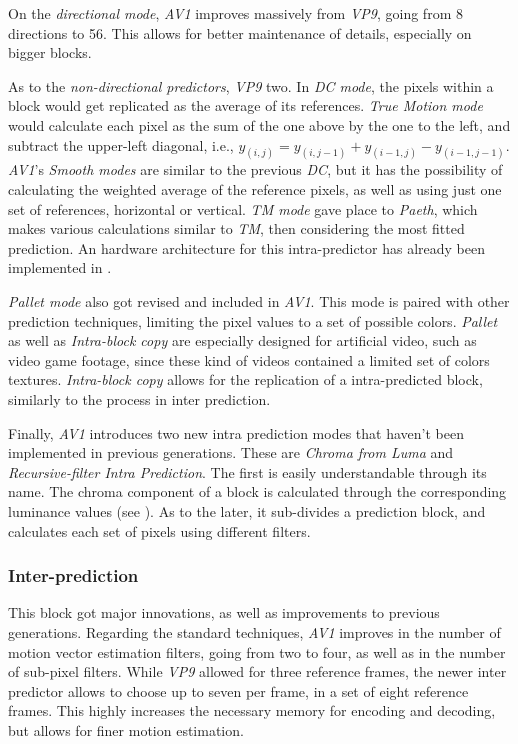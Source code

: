 On the \emph{directional mode}, \emph{AV1} improves massively from \emph{VP9}, going from 8 directions to 56. This allows for better maintenance of details, especially on bigger blocks. 

As to the \emph{non-directional predictors}, \emph{VP9} two. In \emph{DC mode}, the pixels  within a block would get replicated as the average of its references. \emph{True Motion mode} would calculate each pixel as the sum of the one above by the one to the left, and subtract the upper-left diagonal, i.e., $y_{(i,j)}=y_{(i,j-1)}+y_{(i-1,j)}-y_{(i-1,j-1)}$. \emph{AV1}'s \emph{Smooth modes} are similar to the previous \emph{DC}, but it has the possibility of calculating the weighted average of the reference pixels, as well as using just one set of references, horizontal or vertical. \emph{TM mode} gave place to \emph{Paeth}, which makes various calculations similar to \emph{TM}, then considering the most fitted prediction. An hardware architecture for this intra-predictor has already been implemented in \cite{correaHighThroughputHardware2019}.

\emph{Pallet mode} also got revised and included in \emph{AV1}. This mode is paired with other prediction techniques, limiting the pixel values to a set of possible colors. \emph{Pallet} as well as \emph{Intra-block copy} are especially designed for artificial video, such as video game footage, since these kind of videos contained a limited set of colors textures. \emph{Intra-block copy} allows for the replication of a intra-predicted block, similarly to the process in inter prediction.

Finally, \emph{AV1} introduces two new intra prediction modes that haven't been implemented in previous generations. These are \emph{Chroma from Luma} and \emph{Recursive-filter Intra Prediction}. The first is easily understandable through its name. The chroma component of a block is calculated through the corresponding luminance values (see \cite{trudeauPredictingChromaLuma2018}). As to the later, it sub-divides a prediction block, and calculates each set of pixels using different filters.

\subsubsection{Inter-prediction}

This block got major innovations, as well as improvements to previous generations. Regarding the standard techniques, \emph{AV1} improves in the number of motion vector estimation filters, going from two to four, as well as in the number of sub-pixel filters. While \emph{VP9} allowed for three reference frames, the newer inter predictor allows to choose up to seven per frame, in a set of eight reference frames. This highly increases the necessary memory for encoding and decoding, but allows for finer motion estimation.

